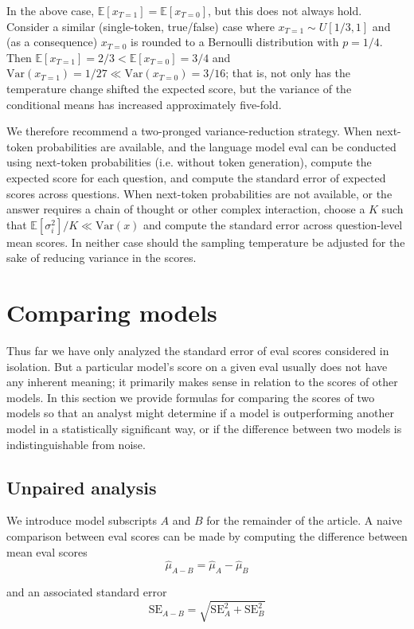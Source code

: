 \documentclass[11pt, oneside]{article}   	%
\newcommand{\E}{\mathbb{E}}
\newcommand{\Var}{\mathrm{Var}}
\newcommand{\standarderror}{\mathrm{SE}}
\begin{document}
In the above case, $\E[x_{T=1}]=\E[x_{T=0}]$, but this does not always hold. Consider a similar (single-token, true/false) case where $x_{T=1}\sim U[1/3,1]$ and (as a consequence) $x_{T=0}$ is rounded to a Bernoulli distribution with $p=1/4$. Then $\E[x_{T=1}]=2/3<\E[x_{T=0}]=3/4$ and  $\Var(x_{T=1})=1/27 \ll \Var(x_{T=0})=3/16$; that is, not only has the temperature change shifted the expected score, but the variance of the conditional means has increased approximately five-fold.

We therefore recommend a two-pronged variance-reduction strategy. When next-token probabilities are available, and the language model eval can be conducted using next-token probabilities (i.e. without token generation), compute the expected score for each question, and compute the standard error of expected scores across questions. When next-token probabilities are not available, or the answer requires a chain of thought or other complex interaction, choose a $K$ such that $\E[\sigma_i^2]/K \ll \Var(x)$ and compute the standard error across question-level mean scores. In neither case should the sampling temperature be adjusted for the sake of reducing variance in the scores.

\section{Comparing models}

Thus far we have only analyzed the standard error of eval scores considered in isolation. But a particular model’s score on a given eval usually does not have any inherent meaning; it primarily makes sense in relation to the scores of other models. In this section we provide formulas for comparing the scores of two models so that an analyst might determine if a model is outperforming another model in a statistically significant way, or if the difference between two models is indistinguishable from noise.

\subsection{Unpaired analysis}

We introduce model subscripts $A$ and $B$ for the remainder of the article. A naive comparison between eval scores can be made by computing the difference between mean eval scores
\[
\hat{\mu}_{A-B}=\hat{\mu}_A-\hat{\mu}_B
\]

and an associated standard error
\[
\standarderror_{A-B}=\sqrt{\standarderror_A^2+\standarderror_B^2}
\]
\end{document}

